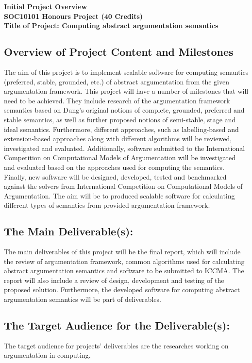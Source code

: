 \textbf{Initial Project Overview} \\
\textbf{SOC10101 Honours Project (40 Credits)}             \\                                          
\textbf{Title of Project: Computing abstract argumentation semantics }\\

\subsection{Overview of Project Content and Milestones}
The aim of this project is to implement scalable software for computing semantics (preferred, stable, grounded, etc.) of abstract argumentation from the given argumentation framework. This project will have a number of milestones that will need to be achieved. They include research of the argumentation framework semantics based on Dung’s original notions of complete, grounded, preferred and stable semantics, as well as further proposed notions of semi-stable, stage and ideal semantics. Furthermore, different approaches, such as labelling-based and extension-based approaches along with different algorithms will be reviewed, investigated and evaluated. Additionally, software submitted to the International Competition on Computational Models of Argumentation will be investigated and evaluated based on the approaches used for computing the semantics. Finally, new software will be designed, developed, tested and benchmarked against the solvers from International Competition on Computational Models of Argumentation. The aim will be to produced scalable software for calculating different types of semantics from provided argumentation framework.

\subsection{The Main Deliverable(s):}
The main deliverables of this project will be the final report, which will include the review of argumentation framework, common algorithms used for calculating abstract argumentation semantics and software to be submitted to ICCMA. The report will also include a review of design, development and testing of the proposed solution. Furthermore, the developed software for computing abstract argumentation semantics will be part of deliverables.

\subsection{The Target Audience for the Deliverable(s):}
The target audience for projects’ deliverables are the researches working on argumentation in computing.

